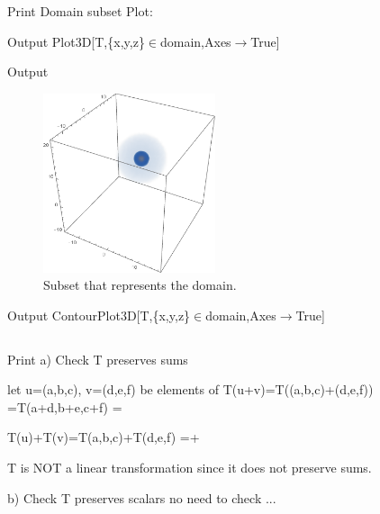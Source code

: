 \documentclass[11pt,a4paper]{article}
\begin{document}
\begin{mmaCell}{Print}
Domain subset Plot:
\end{mmaCell}

\begin{mmaCell}[]{Output}
Plot3D[T,\{x,y,z\}\(\in\)domain,Axes\(\to\)True]
\end{mmaCell}

\begin{mmaCell}[]{Output}

\end{mmaCell}
\begin{figure}[!h]
\begin{mdframed}
\centering
\includegraphics[width=0.45\textwidth]{./media/problem1aDomainSubset2.png}
\end{mdframed}
\caption{Subset that represents the domain.\label{figure_ambush}}
\end{figure}

\begin{mmaCell}[]{Output}
ContourPlot3D[T,\{x,y,z\}\(\in\)domain,Axes\(\to\)True]
\end{mmaCell}

\subsection{}
\begin{mmaCell}[moredefined={T}]{Print}
a) Check T preserves sums

let u=(a,b,c), v=(d,e,f) be elements of 
T(u+v)=T((a,b,c)+(d,e,f))
      =T(a+d,b+e,c+f)
      =

T(u)+T(v)=T(a,b,c)+T(d,e,f)
         =+

T is NOT a linear transformation since it does not preserve sums.

b) Check T preserves scalars
   no need to check ...
\end{mmaCell}
\end{document}
